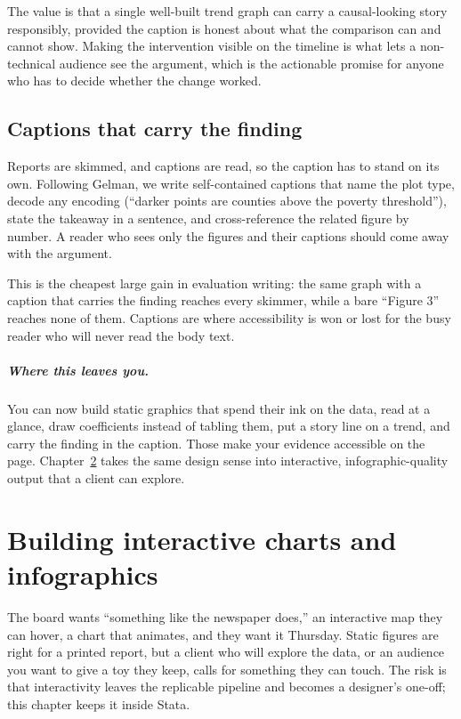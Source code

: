 \documentclass[
    a4paper,
    fontsize=10pt,
    twoside=true,
    numbers=noenddot,
]{kaobook}
\begin{document}
The value is that a single well-built trend graph can carry a causal-looking story responsibly, provided the caption is honest about what the comparison can and cannot show. Making the intervention visible on the timeline is what lets a non-technical audience see the argument, which is the actionable promise for anyone who has to decide whether the change worked.

\section{Captions that carry the finding}\label{sec:captions}
Reports are skimmed, and captions are read, so the caption has to stand on its own. Following Gelman, we write self-contained captions that name the plot type, decode any encoding (\enquote{darker points are counties above the poverty threshold}), state the takeaway in a sentence, and cross-reference the related figure by number. A reader who sees only the figures and their captions should come away with the argument.

This is the cheapest large gain in evaluation writing: the same graph with a caption that carries the finding reaches every skimmer, while a bare \enquote{Figure 3} reaches none of them. Captions are where accessibility is won or lost for the busy reader who will never read the body text.

\paragraph{Where this leaves you.} You can now build static graphics that spend their ink on the data, read at a glance, draw coefficients instead of tabling them, put a story line on a trend, and carry the finding in the caption. Those make your evidence accessible on the page. Chapter~\ref{ch:interactive} takes the same design sense into interactive, infographic-quality output that a client can explore.

\chapter{Building interactive charts and infographics}\label{ch:interactive}

The board wants \enquote{something like the newspaper does,} an interactive map they can hover, a chart that animates, and they want it Thursday. Static figures are right for a printed report, but a client who will explore the data, or an audience you want to give a toy they keep, calls for something they can touch. The risk is that interactivity leaves the replicable pipeline and becomes a designer's one-off; this chapter keeps it inside Stata.
\end{document}
